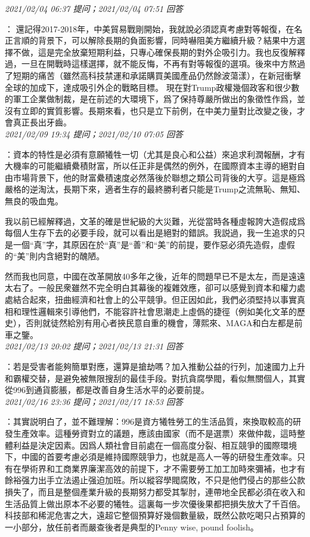 \documentclass[twocolumn]{ctexart}
\begin{document}
\textit{\hfill\noindent\small 2021/02/04 06:37 提问；2021/02/04 07:51 回答}

：
還記得2017-2018年，中美貿易戰剛開始，我就說必須認真考慮對等報復，在名正言順的背景下，可以解除長期的負面影響，同時嚇阻美方繼續升級？結果中方選擇不做，這是完全放棄短期利益，只專心確保長期的對外企吸引力。我也反復解釋過，一旦在開戰時這樣選擇，就不能反悔，不再有對等報復的選項。後來中方熬過了短期的痛苦（雖然高科技禁運和承諾購買美國產品仍然餘波蕩漾），在新冠衝擊全球的加成下，達成吸引外企的戰略目標。
現在對Trump政權幾個政客和很少數的軍工企業做制裁，是在前述的大環境下，爲了保持尊嚴所做出的象徵性作爲，並沒有立即的實質影響。長期來看，也只是立下前例，在中美力量對比改變之後，才會真正長出牙齒。
\\

\textit{\hfill\noindent\small 2021/02/09 19:34 提问；2021/02/10 07:05 回答}

：資本的特性是必須有意願犧牲一切（尤其是良心和公益）來追求利潤報酬，才有大機率的可能繼續纍積財富，所以任正非是偶然的例外，在國際資本主導的絕對自由市場背景下，他的財富纍積速度必然落後於聯想之類公司背後的大亨。這是極爲嚴格的逆淘汰，長期下來，適者生存的最終勝利者只能是Trump之流無恥、無知、無良的吸血鬼。

我以前已經解釋過，文革的確是世紀級的大災難，光從當時各種虛報誇大造假成爲每個人生存下去的必要手段，就可以看出是絕對的錯誤。我説過，我一生追求的只是一個“真”字，其原因在於“真”是“善”和“美”的前提，要作惡必須先造假，虛假的“美”則内含絕對的醜陋。

然而我也同意，中國在改革開放40多年之後，近年的問題早已不是太左，而是遠遠太右了。一般民衆雖然不完全明白其幕後的複雜效應，卻可以感覺到資本和權力處處結合起來，扭曲經濟和社會上的公平競爭。但正因如此，我們必須堅持以事實真相和理性邏輯來引導他們，不能容許社會思潮走上虛僞的捷徑（例如美化文革的歷史），否則就徒然給別有用心者挾民意自重的機會，薄熙來、MAGA和白左都是前車之鑒。
\\

\textit{\hfill\noindent\small 2021/02/13 20:02 提问；2021/02/13 21:31 回答}

：若是受害者能夠簡單對應，還算是搶劫嗎？加入推動公益的行列，加速國力上升和霸權交替，是避免被無限搜刮的最佳手段。對抗貪腐學閥，看似無關個人，其實從996到通貨膨脹，都是改善自身生活水平的必要前提。
\\

\textit{\hfill\noindent\small 2021/02/16 23:36 提问；2021/02/17 18:53 回答}

：其實説明白了，並不難理解：996是資方犧牲勞工的生活品質，來換取較高的研發生產效率。這種勞資對立的議題，應該由國家（而不是選票）來做仲裁，這時整體利益是決定因素。因爲人類社會目前處在一個高度分裂、相互競爭的國際環境下，中國的首要考慮必須是維持國際競爭力，也就是高人一等的研發生產效率。只有在學術界和工商業界廉潔高效的前提下，才不需要勞工加工加時來彌補，也才有餘裕强力出手立法遏止强迫加班。所以縱容學閥腐敗，不只是他們侵占的那些公款損失了，而且是整個產業升級的長期努力都受其掣肘，連帶地全民都必須在收入和生活品質上做出原本不必要的犧牲。這裏每一步次優後果都把損失放大了千百倍。科技部和稀泥危害之大，遠超它整個預算好幾個數量級，既然公款吃喝只占預算的一小部分，放任前者而嚴查後者是典型的Penny wise, pound foolish。
\end{document}
